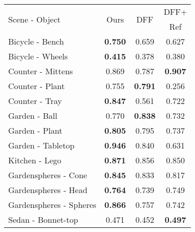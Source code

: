 \begin{table}[]
\centering
\begin{tabular}{lccc}
\toprule
\multirow{2}{*}{Scene - Object} & \multirow{2}{*}{Ours} &  \multirow{2}{*}{DFF} & DFF+  \\
&  & & Ref  \\ 
\midrule
Bicycle - Bench                          & \textbf{0.750}                    & 0.659                   & 0.627                       \\
Bicycle - Wheels                         & \textbf{0.415}                    & 0.378                   & 0.380                       \\
Counter - Mittens                        & 0.869                    & 0.787                   & \textbf{0.907}                       \\
Counter - Plant                          & 0.755                    & \textbf{0.791}                   & 0.256                       \\
Counter - Tray                           & \textbf{0.847}                    & 0.561                   & 0.722                       \\
Garden - Ball                            & 0.770                    & \textbf{0.838}                   & 0.732                       \\
Garden - Plant                           & \textbf{0.805}                    & 0.795                   & 0.737                       \\
Garden - Tabletop                        & \textbf{0.946}                    & 0.840                   & 0.631                       \\
Kitchen - Lego                           & \textbf{0.871}                    & 0.856                   & 0.850                       \\
Gardenspheres - Cone                     & \textbf{0.845}                    & 0.833                   & 0.817                       \\
Gardenspheres - Head                     & \textbf{0.764}                    & 0.739                   & 0.749                       \\
Gardenspheres - Spheres                  & \textbf{0.866}                    & 0.757                   & 0.742                       \\
Sedan - Bonnet-top                        & 0.471                    & 0.452                   & \textbf{0.497}                       \\

\end{tabular}
\end{table}
